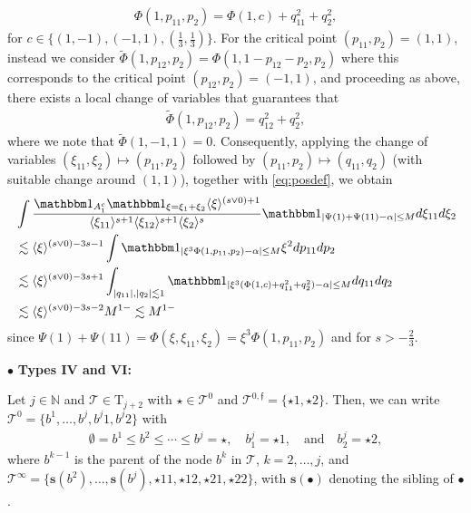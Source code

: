 \documentclass[%
11pt,  reqno]{amsart}
\newcommand{\5}{\textup{V}}
\newcommand{\noi}{\noindent}
\newcommand{\ind}{\mathbbm 1}
\newcommand{\les}{\lesssim}
\newcommand{\wt}{\widetilde}
\theoremstyle{remark}
\newcommand{\bul}{\bullet}
\newcommand{\TT}{\mathcal{T}}
\newcommand{\Tr}{\mathrm{T}}
\newcommand{\al}{\alpha}
\newcommand{\sbf}{\mathbf{s}}
\newcommand{\jb}[1]
{\langle #1 \rangle}
\newcommand{\ff}{\mathfrak{f}}
\newcommand{\N}{\mathbb{N}}
\numberwithin{equation}{section}
\numberwithin{theorem}{section}
\begin{document}
\begin{align}
\Phi(1, p_{11},p_2) = \Phi(1, c) + q_{11}^2 + q_2^2, 
\end{align}
for $c\in\{(1,-1), (-1,1), (\frac13, \frac13)\}$. For the critical point $(p_{11}, p_2) =(1,1)$, instead we consider $\wt\Phi(1, p_{12}, p_2) = \Phi(1, 1-p_{12}-p_2, p_2)$ where this corresponds to the critical point $(p_{12}, p_2) = (-1,1)$, and proceeding as above, there exists a local change of variables that guarantees that
\begin{align}
\wt\Phi(1, p_{12}, p_2) = q_{12}^2 + q_2^2, 
\end{align}
where we note that $\wt\Phi(1,-1,1)=0$. 
Consequently, applying the change of variables $(\xi_{11},\xi_2) \mapsto (p_{11}, p_2)$ followed by $(p_{11}, p_2) \mapsto (q_{11}, q_2)$ (with suitable change around $(1,1)$), together with \eqref{eq:posdef}, we obtain
\begin{align}
&
\int \frac{\ind_{A_1^c} \ind_{\xi=\xi_1+\xi_2} \jb{\xi}^{(s \lor 0 )+ 1}}{ \jb{\xi_{11}}^{s+1} \jb{\xi_{12}}^{s+1} \jb{\xi_2}^s}
\ind_{|\Psi(1) + \Psi(11) - \al| \le M}
d\xi_{11} d\xi_2
\\
&
\les 
\jb{\xi}^{(s\lor 0) - 3 s - 1   } \int \ind_{|\xi^3 \Phi(1, p_{11}, p_2) - \al| \le M} \xi^2 dp_{11} dp_2
\\
&
\les 
\jb{\xi}^{(s\lor 0)- 3s + 1  } \int_{|q_{11}|, |q_2| \les 1} \ind_{| \xi^3( \Phi(1,c) + q_{11}^2 +  q_2^2 )- \al | \le M  } dq_{11} d q_2
\\
&
\les 
\jb{\xi}^{(s\lor 0)- 3s -2   } M^{1-} \les M^{1-}
\end{align}
since $\Psi(1) + \Psi(11) = \Phi(\xi, \xi_{11},\xi_2) = \xi^3 \Phi(1, p_{11}, p_2)$ and for $s>-\frac23$. 


\smallskip 

\noi
$\bul$ \textbf{Types IV and VI: }

Let $j\in \N$ and $\TT\in \Tr_{j+2}$ with $\star\in \TT^0$ and $\TT^{0,\ff} = \{\star1, \star2\}$. Then, we can write $\TT^0 = \{b^1, \ldots, b^j, b^j1, b^j2\}$ with
\begin{align}
\label{II1}
    \emptyset = b^1 \le b^2 \le \cdots \le b^j = \star, 
    \quad 
    b^j_1 = \star1, 
    \quad 
    \text{and}
    \quad 
    b^j_2 = \star2, 
\end{align}
where $b^{k-1}$ is the parent of the node $b^k$ in $\TT$, $k=2, \ldots, j$, and $\TT^\infty = \{ \sbf(b^2), \ldots, \sbf(b^j), \star11, \star12, \star21, \star22 \}$, with $\sbf(\bul)$ denoting the sibling of $\bul$. 
\end{document}
